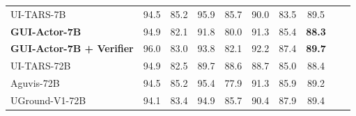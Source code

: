 \begin{table}[!t]
{\begin{tabular}{lccccccccl}
UI-TARS-7B & 94.5 & 85.2 & 95.9 & 85.7 & 90.0 & 83.5 & \cellcolor{lightblue}89.5 \\
\cellcolor{lightblue}\textbf{GUI-Actor-7B} & \cellcolor{lightblue}94.9 & \cellcolor{lightblue}82.1 & \cellcolor{lightblue}91.8 & \cellcolor{lightblue}80.0& \cellcolor{lightblue}91.3 & \cellcolor{lightblue}85.4 & \cellcolor{lightblue}\textbf{88.3} \\
\cellcolor{lightblue}\textbf{GUI-Actor-7B + Verifier} &
\cellcolor{lightblue}96.0 & \cellcolor{lightblue}83.0 & \cellcolor{lightblue}93.8 & \cellcolor{lightblue}82.1 & \cellcolor{lightblue}92.2 & \cellcolor{lightblue}87.4 & \cellcolor{lightblue}\textbf{89.7} \\
\midrule
UI-TARS-72B & 94.9 & 82.5 & 89.7 & 88.6 & 88.7 & 85.0 & \cellcolor{lightblue}88.4 \\
Aguvis-72B & 94.5 & 85.2 & 95.4 & 77.9 & 91.3 & 85.9 & \cellcolor{lightblue}89.2 \\
UGround-V1-72B & 94.1 & 83.4 & 94.9 & 85.7 & 90.4 & 87.9 & \cellcolor{lightblue}89.4\\
\bottomrule
\end{tabular}
}
\label{tab:screenspot}
\end{table}
